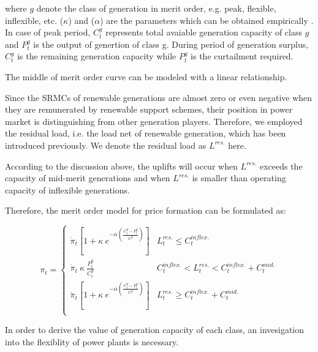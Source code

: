 where $g$ denote the class of generation in merit order, e.g. peak, flexible, inflexible, etc. ($\kappa$) and ($\alpha$) are the parameters which can be obtained empirically \cite{Cox2009}. In case of peak period, $C^g_t$ represents total avaiable generation capacity of class $g$ and $P^g_t$ is the output of genertion of class g. During period of generation surplus, $C^g_t$ is the remaining generation capacity while $P^g_t$ is the curtailment required.

The middle of merit order curve can be modeled with a linear relationship.

Since the SRMCs of renewable generations are almost zero or even negative when they are remunerated by renewable support schemes, their position in power market is distinguishing from other generation players. Therefore, we employed the residual load, i.e. the load net of renewable generation, which has been introduced previously. We denote the residual load as $L^{res.}$ here.

According to the discussion above, the uplifts will occur when $L^{res.}$ exceeds the capacity of mid-merit generations and when $L^{res.}$ is smaller than operating capacity of inflexible generations.

Therefore, the merit order model for price formation can be formulated as:

\begin{equation}
\label{eq:merit-order-model}
\pi_t = \begin{cases}
\dot{\pi}_t \left[1 + \kappa~e^{-\alpha\left(\frac{C_t^g -P^g_t }{C^g}\right)} \right] & L^{res.}_t \leq C^{inflex.}_t\\ 
\dot{\pi}_t ~\kappa~\frac{P^g_t}{C_t^g} & C^{inflex.}_t < L^{res.}_t < C^{inflex.}_t+ C^{mid.}_t\\
\dot{\pi}_t  \left[1 + \kappa~e^{-\alpha\left(\frac{C_t^g -P^g_t }{C^g}\right)} \right] & L^{res.}_t \geq C^{inflex.}_t + C^{mid.}_t\\
\end{cases}
\end{equation}

In order to derive the value of generation capacity of each class, an invesigation into the flexiblity of power plants is necessary.

